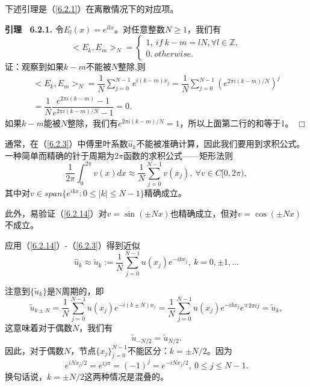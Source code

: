     下述引理是（\ref{6.2.1}）在离散情况下的对应项。
    
\textbf{引理 \ 6.2.1.}  令$E_l(x) = e^{ilx}$。对任意整数$N \geq 1$，我们有
\begin{equation}
    <E_k,E_m>_N = 
      \left\{
        \begin{array}{l}
           1, \   if \  k - m = lN, \forall l \in \mathbb{Z}, \\
           0. \   otherwise.        
        \end{array}         
      \right.     
      \label{6.2.12}
\end{equation}    
    证：观察到如果$k - m$不能被$N$整除,则
\begin{equation*}
\begin{gathered}
    < E_k,E_m >_N = \dfrac{1}{N} \sum_{j = 0}^{N-1} e^{i(k - m)x_j} = \dfrac{1}{N} \sum_{j = 0}^{N-1} \left(e^{2\pi i (k - m)/N}\right)^j  \\
                  = \dfrac{1}{N} \dfrac{e^{2\pi i(k-m)} - 1}{e^{2\pi i(k-m)/N}-1} = 0.
\end{gathered}    
\end{equation*}  
    如果$k - m$能被$N$整除，我们有$e^{2\pi i(k -m)/N} = 1$，所以上面第二行的和等于1。 \quad   $\Box$

    通常，在（\ref{6.2.3}）中傅里叶系数$\hat{u}_k$不能被准确计算，因此我们要用到求积公式。一种简单而精确的针于周期为$2\pi$函数的求积公式——矩形法则    
\begin{equation}
    \dfrac{1}{2\pi} \int_0^{2\pi} v(x) dx \approx \dfrac{1}{N} \sum_{j = 0}^{N-1} v(x_j),  \  \forall v \in C[0,2\pi),
    \label{6.2.14}
\end{equation}        
其中对$v \in span\{ e^{ikx}: 0\leq |k| \leq N-1 \}$精确成立。

    此外，易验证（\ref{6.2.14}）对$v = \sin (\pm Nx)$也精确成立，但对$v = \cos (\pm Nx)$不成立。
    
    应用（\ref{6.2.14}）-（\ref{6.2.3}）得到近似    
\begin{equation}
    \hat{u}_k \approx \widetilde{u}_k := \dfrac{1}{N} \sum_{j = 0}^{N-1} u(x_j)e^{-ikx_j}, \   k = 0,\pm 1,...
    \label{6.2.15}
\end{equation}    

    注意到$\{ \widetilde{u}_k \}$是N周期的，即    
\begin{equation*}
    \widetilde{u}_{k\pm N} = \dfrac{1}{N} \sum_{j = 0}^{N-1} u(x_j)e^{-i(k\pm N)x_j} = \dfrac{1}{N} \sum_{j = 0}^{N-1} u(x_j)e^{-ikx_j}e^{\mp 2\pi ij} = \widetilde{u}_k,
\end{equation*}    
    这意味着对于偶数$N$，我们有    
\begin{equation}
    \widetilde{u}_{-N/2} = \widetilde{u}_{N/2}.
\end{equation}    
    因此，对于偶数$N$，节点$\{ x_j \}_{j = 0}^{N-1}$不能区分：$k = \pm N/2$。因为
\begin{equation}
    e^{iNx_j/2} = e^{ij\pi} = (-1)^j = e^{-iNx_j/2}, \   0\leq j\leq N-1.
\end{equation}
    换句话说，$k = \pm N/2$这两种情况是混叠的。
    
